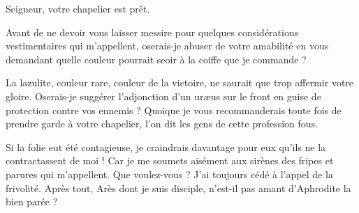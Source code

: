 \begin{drama}
  \intrat{\page}

  \pagespeaks {} Seigneur, votre chapelier est prêt.

  \generalspeaks Avant de ne devoir vous laisser messire \elena{} pour quelques considérations vestimentaires qui m’appellent, oserais-je abuser de votre amabilité en vous demandant quelle couleur pourrait seoir à la coiffe que je commande ?

  \elenaspeaks La lazulite, couleur rare, couleur de la victoire, ne saurait que trop affermir votre gloire. Oserais-je suggérer l’adjonction d’un uræus sur le front en guise de protection contre vos ennemis ? Quoique je vous recommanderais toute fois de prendre garde à votre chapelier, l’on dit les gens de cette profession fous.

  \generalspeaks   Si la folie eut été contagieuse, je craindrais davantage pour eux  qu’ils ne la contractassent de moi ! Car je me soumets aisément aux sirènes des fripes et parures qui m’appellent. Que voulez-vous ? J’ai toujours cédé à l’appel de la frivolité. Après tout, Arès dont je suis disciple, n’est-il pas amant d’Aphrodite la bien parée ?


  \exit{\general}

\end{drama}

\scene

\StageDirII{\elena, \alexas}


